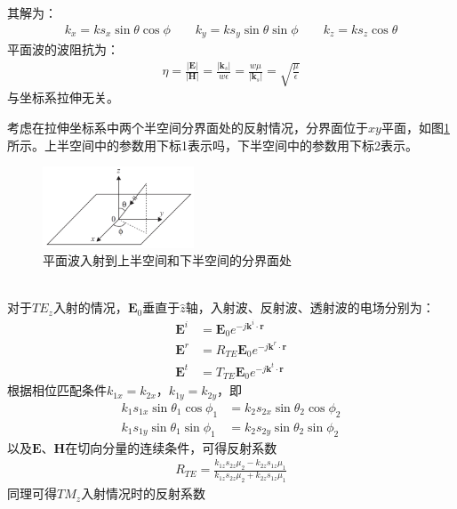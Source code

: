 \documentclass{article}
\numberwithin{equation}{section}
\renewcommand{\vec}[1]{\boldsymbol{#1}}
\begin{document}
其解为：
\begin{align}
    \label{eq:eq613}
    k_x=ks_x\sin\theta\cos\phi\qquad k_y=ks_y\sin\theta\sin\phi\qquad k_z=ks_z\cos\theta
\end{align}
平面波的波阻抗为：
\begin{align}
    \label{eq:eq614}
    \eta=\frac{|\mathbf{E}|}{|\mathbf{H}|}=\frac{|\vec{k}_s|}{w\epsilon}=\frac{w\mu}{|\vec{k}_s|}=\sqrt{\frac{\mu}{\epsilon}}
\end{align}
与坐标系拉伸无关。\par
考虑在拉伸坐标系中两个半空间分界面处的反射情况，分界面位于$xy$平面，如图\ref{fig:fig52}所示。上半空间中的参数用下标1表示吗，下半空间中的参数用下标2表示。
\begin{figure}[ht]
    \centering
    \includegraphics[width=0.4\textwidth]{平面波入射到上班空间和下半空间的分界面处.PNG}
    \caption{平面波入射到上半空间和下半空间的分界面处}
    \label{fig:fig52}
\end{figure}
\\
对于$TE_z$入射的情况，$\mathbf{E}_0$垂直于$\hat{z}$轴，入射波、反射波、透射波的电场分别为：
\begin{align}
    \label{eq:eq615}
    \mathbf{E}^i&=\mathbf{E}_0e^{-j\vec{k}^i\cdot\vec{r}} \\
    \label{eq:eq616}
    \mathbf{E}^r&=R_{TE}\mathbf{E}_0e^{-j\vec{k}^r\cdot\vec{r}} \\
    \label{eq:eq617}
    \mathbf{E}^t&=T_{TE}\mathbf{E}_0e^{-j\vec{k}^t\cdot\vec{r}}
\end{align}
根据相位匹配条件$k_{1x}=k_{2x}$，$k_{1y}=k_{2y}$，即
\begin{align}
    \label{eq:eq618}
    k_1s_{1x}\sin\theta_1\cos\phi_1&=k_2s_{2x}\sin\theta_2\cos\phi_2 \\
    \label{eq:eq619}
    k_1s_{1y}\sin\theta_1\sin\phi_1&=k_2s_{2y}\sin\theta_2\sin\phi_2
\end{align}
以及$\mathbf{E}$、$\mathbf{H}$在切向分量的连续条件，可得反射系数
\begin{align}
    \label{eq:eq620}
    R_{TE}=\frac{k_{1z}s_{2z}\mu_2-k_{2z}s_{1z}\mu_1}{k_{1z}s_{2z}\mu_2+k_{2z}s_{1z}\mu_1}
\end{align}
同理可得$TM_z$入射情况时的反射系数
\end{document}
